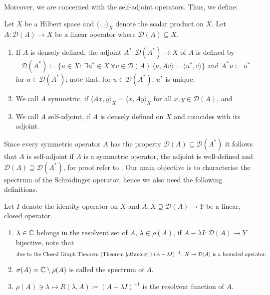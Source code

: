 Moreover, we are concerned with the self-adjoint operators. Thus, we define:

\begin{definition}
Let $X$ be a Hilbert space and $\langle \cdot, \cdot \rangle_{X}$ denote the scalar product on $X$. Let $A \colon \mathcal{D}(A) \rightarrow X$ be a linear operator where $\mathcal{D}(A) \subseteq X$.
	\begin{enumerate}[label=\alph*\upshape)]
		\item If $A$ is densely defined, the adjoint $A^{*} \colon \mathcal{D}(A^{*}) \rightarrow X$ of $A$ is defined by 
		\[ \mathcal{D}(A^{*}) \coloneqq \{ u \in X \colon ~\exists u^{*} \in X ~\forall v \in \mathcal{D}(A) ~\langle u, Av \rangle = \langle u^{*} , v \rangle \} \text{ and } A^{*} u \coloneqq u^{*} \] for $u \in \mathcal{D}(A^{*})$; note that, for $u \in \mathcal{D}(A^{*})$, $u^{*}$ is unique.
		\item We call $A$ symmetric, if $\langle Ax,y \rangle_{X} = \langle x , Ay \rangle_{X}$ for all $x,y \in \mathcal{D}(A)$, and
		\item We call $A$ self-adjoint, if $A$ is densely defined on $X$ and coincides with its adjoint.
	\end{enumerate}
\end{definition}

Since every symmetric operator $A$ has the property $\mathcal{D}(A) \subseteq \mathcal{D}(A^{*})$ it follows that $A$ is self-adjoint if $A$ is a symmetric operator, the adjoint is well-defined and $\mathcal{D}(A) \supseteq \mathcal{D}(A^{*})$, for proof refer to \cite[p. 256]{reed1908methods}. Our main objective is to characterise the spectrum of the Schrödinger operator, hence we also need the following definitions.

\begin{definition}
Let $I$ denote the identity operator on $X$ and $A \colon X \supseteq \mathcal{D}(A) \rightarrow Y$ be a linear, closed operator.
	\begin{enumerate}[label=\alph*\upshape)]
		\item $\lambda \in \mathbb{C}$ belongs in the resolvent set of $A$, $\lambda \in \rho(A)$, if $A  - \lambda I \colon \mathcal{D}(A) \rightarrow Y$ bijective, note that
			\[ \text{due to the Closed Graph Theorem (Theorem \ref{athm:cgt}) } (A - \lambda I)^{-1} \colon X \rightarrow \mathcal{D}(A) \text{ is a bounded operator.} \]
		\item $\sigma(A) = \mathbb{C} \setminus \rho(A)$ is called the spectrum of $A$. 
		\item $\rho(A) \ni \lambda \mapsto R(\lambda, A) \coloneqq (A - \lambda I)^{-1}$ is the resolvent function of $A$.
	\end{enumerate}		
\end{definition}

